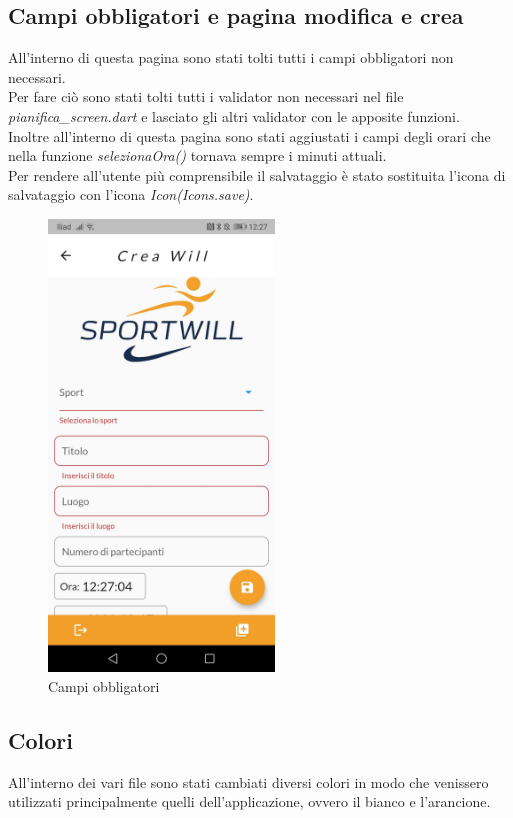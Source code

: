 \newpage

\subsection{Campi obbligatori e pagina modifica e crea}
All'interno di questa pagina sono stati tolti tutti i campi obbligatori non necessari.\\
Per fare ciò sono stati tolti tutti i validator non necessari nel file \textit{pianifica\_screen.dart} e lasciato gli altri validator con le apposite funzioni.\\
Inoltre all'interno di questa pagina sono stati aggiustati i campi degli orari che nella funzione \textit{selezionaOra()} tornava sempre i minuti attuali.\\
Per rendere all'utente più comprensibile il salvataggio è stato sostituita l'icona di salvataggio con l'icona \textit{Icon(Icons.save)}.\\

\begin{figure}[htbp]	
	\centering
	\includegraphics[width=6cm]{immagini/modifica.jpeg}
	\caption{Campi obbligatori}
	\label{fig:Campi obbligatori}
\end{figure}

\newpage

\subsection{Colori}
All'interno dei vari file sono stati cambiati diversi colori in modo che venissero utilizzati principalmente quelli dell'applicazione, ovvero il bianco e l'arancione.\\

